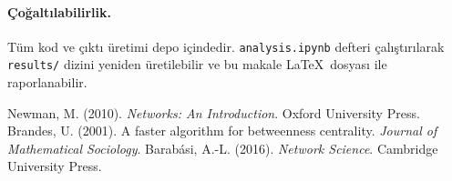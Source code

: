 \documentclass[11pt,a4paper]{article}
\begin{document}
\paragraph{Çoğaltılabilirlik.} Tüm kod ve çıktı üretimi depo içindedir. \texttt{analysis.ipynb} defteri çalıştırılarak \texttt{results/} dizini yeniden üretilebilir ve bu makale \LaTeX~dosyası ile raporlanabilir.


\begin{thebibliography}{9}
 Newman, M. (2010). \emph{Networks: An Introduction}. Oxford University Press.
 Brandes, U. (2001). A faster algorithm for betweenness centrality. \emph{Journal of Mathematical Sociology}.
 Barab\'asi, A.-L. (2016). \emph{Network Science}. Cambridge University Press.
\end{thebibliography}
\end{document}
